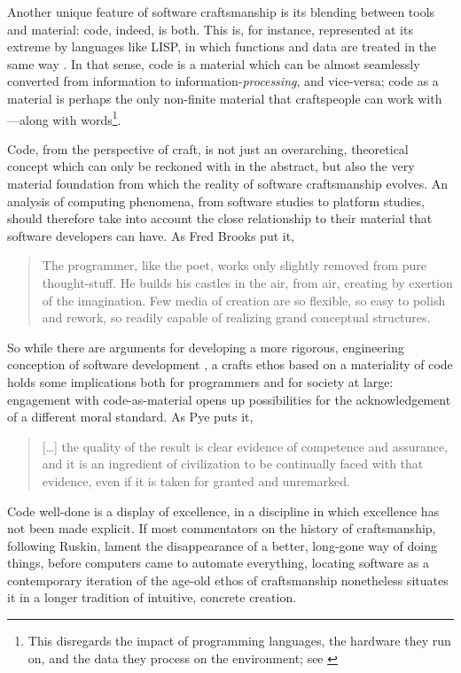 Another unique feature of software craftsmanship is its blending between tools and material: code, indeed, is both. This is, for instance, represented at its extreme by languages like LISP, in which functions and data are treated in the same way \citep{mccarthy_lisp_1965}. In that sense, code is a material which can be almost seamlessly converted from information to information-\emph{processing}, and vice-versa; code as a material is perhaps the only non-finite material that craftspeople can work with—along with words\footnote{This disregards the impact of programming languages, the hardware they run on, and the data they process on the environment; see \citep{kurp_green_2008}}.

Code, from the perspective of craft, is not just an overarching, theoretical concept which can only be reckoned with in the abstract, but also the very material foundation from which the reality of software craftsmanship evolves. An analysis of computing phenomena, from software studies to platform studies, should therefore take into account the close relationship to their material that software developers can have. As Fred Brooks put it,

\begin{quote}
    The programmer, like the poet, works only slightly removed from pure thought-stuff. He builds his castles in the air, from air, creating by exertion of the imagination. Few media of creation are so flexible, so easy to polish and rework, so readily capable of realizing grand conceptual structures. \citep{brooksjr_mythical_1975}
\end{quote}

So while there are arguments for developing a more rigorous, engineering conception of software development \citep{ensmenger_computer_2012}, a crafts ethos based on a materiality of code holds some implications both for programmers and for society at large: engagement with code-as-material opens up possibilities for the acknowledgement of a different moral standard. As Pye puts it,

\begin{quote}
    [\dots] the quality of the result is clear evidence of competence and assurance, and it is an ingredient of civilization to be continually faced with that evidence, even if it is taken for granted and unremarked. \citep{pye_nature_2008}
\end{quote}

Code well-done is a display of excellence, in a discipline in which excellence has not been made explicit. If most commentators on the history of craftsmanship, following Ruskin, lament the disappearance of a better, long-gone way of doing things, before computers came to automate everything, locating software as a contemporary iteration of the age-old ethos of craftsmanship nonetheless situates it in a longer tradition of intuitive, concrete creation.

